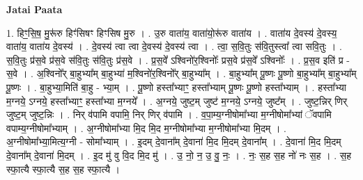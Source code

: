 \documentclass[17pt]{extarticle}
\begin{document}
\textbf{Jatai Paata} \newline

1. हिꣳ॒॒सि॒ष॒ मु॒रू॑रु हिꣳ॑सिषꣳ हिꣳसिष मु॒रु । . उ॒रु वाता॑य॒ वाता॑यो॒रू॑रु वाता॑य । . वाता॑य दे॒वस्य॑ दे॒वस्य॒ वाता॑य॒ वाता॑य दे॒वस्य॑ । . दे॒वस्य॑ त्वा त्वा दे॒वस्य॑ दे॒वस्य॑ त्वा । . त्वा॒ स॒वि॒तुः स॑वि॒तुस्त्वा᳚ त्वा सवि॒तुः । . स॒वि॒तुः प्र॑स॒वे प्र॑स॒वे स॑वि॒तुः स॑वि॒तुः प्र॑स॒वे । . प्र॒स॒वे᳚ ऽश्विनो॑र॒श्विनोः᳚ प्रस॒वे प्र॑स॒वे᳚ ऽश्विनोः᳚ । . प्र॒स॒व इति॑ प्र - स॒वे । . अ॒श्विनो᳚र् बा॒हुभ्या᳚म् बा॒हुभ्या॑ म॒श्विनो॑र॒श्विनो᳚र् बा॒हुभ्या᳚म् । . बा॒हुभ्या᳚म् पू॒ष्णः पू॒ष्णो बा॒हुभ्या᳚म् बा॒हुभ्या᳚म् पू॒ष्णः । . बा॒हुभ्या॒मिति॑ बा॒हु - भ्या॒म् । . पू॒ष्णो हस्ता᳚भ्याꣳ॒॒ हस्ता᳚भ्याम् पू॒ष्णः पू॒ष्णो हस्ता᳚भ्याम् । . हस्ता᳚भ्या म॒ग्नये॒ ऽग्नये॒ हस्ता᳚भ्याꣳ॒॒ हस्ता᳚भ्या म॒ग्नये᳚ । . अ॒ग्नये॒ जुष्ट॒म् जुष्ट॑ म॒ग्नये॒ ऽग्नये॒ जुष्ट᳚म् । . जुष्ट॒न्निर् णिर् जुष्ट॒म् जुष्ट॒न्निः । . निर् व॑पामि वपामि॒ निर् णिर् व॑पामि । . व॒पा॒म्य॒ग्नीषोमा᳚भ्या म॒ग्नीषोमा᳚भ्यां ॅवपामि वपाम्य॒ग्नीषोमा᳚भ्याम् । . अ॒ग्नीषोमा᳚भ्या मि॒द मि॒द म॒ग्नीषोमा᳚भ्या म॒ग्नीषोमा᳚भ्या मि॒दम् । . अ॒ग्नीषोमा᳚भ्या॒मित्य॒ग्नी - सोमा᳚भ्याम् । . इ॒दम् दे॒वाना᳚म् दे॒वाना॑ मि॒द मि॒दम् दे॒वाना᳚म् । . दे॒वाना॑ मि॒द मि॒दम् दे॒वाना᳚म् दे॒वाना॑ मि॒दम् । . इ॒द मु॑ वु वि॒द मि॒द मु॑ । . उ॒ नो॒ न॒ उ॒ वु॒ नः॒ । . नः॒ स॒ह स॒ह नो॑ नः स॒ह । . स॒ह स्फा॒त्यै स्फा॒त्यै स॒ह स॒ह स्फा॒त्यै । \newline
\end{document}
